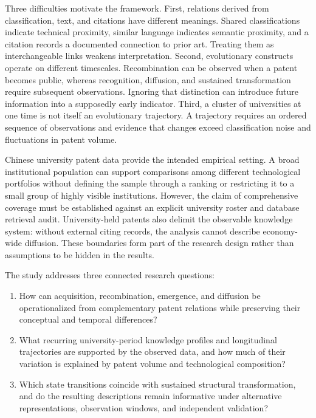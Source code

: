 Three difficulties motivate the framework. First, relations derived from
classification, text, and citations have different meanings. Shared classifications
indicate technical proximity, similar language indicates semantic proximity, and a
citation records a documented connection to prior art. Treating them as interchangeable
links weakens interpretation. Second, evolutionary constructs operate on different
timescales. Recombination can be observed when a patent becomes public, whereas
recognition, diffusion, and sustained transformation require subsequent observations.
Ignoring that distinction can introduce future information into a supposedly early
indicator. Third, a cluster of universities at one time is not itself an evolutionary
trajectory. A trajectory requires an ordered sequence of observations and evidence
that changes exceed classification noise and fluctuations in patent volume.

Chinese university patent data provide the intended empirical setting. A broad
institutional population can support comparisons among different technological
portfolios without defining the sample through a ranking or restricting it to a
small group of highly visible institutions. However, the claim of comprehensive
coverage must be established against an explicit university roster and database
retrieval audit. University-held patents also delimit the observable knowledge
system: without external citing records, the analysis cannot describe economy-wide
diffusion. These boundaries form part of the research design rather than assumptions
to be hidden in the results.

The study addresses three connected research questions:
\begin{enumerate}[label=\textbf{RQ\arabic*.}]
\item How can acquisition, recombination, emergence, and diffusion be operationalized
from complementary patent relations while preserving their conceptual and temporal
differences?
\item What recurring university-period knowledge profiles and longitudinal trajectories
are supported by the observed data, and how much of their variation is explained by
patent volume and technological composition?
\item Which state transitions coincide with sustained structural transformation,
and do the resulting descriptions remain informative under alternative representations,
observation windows, and independent validation?
\end{enumerate}

